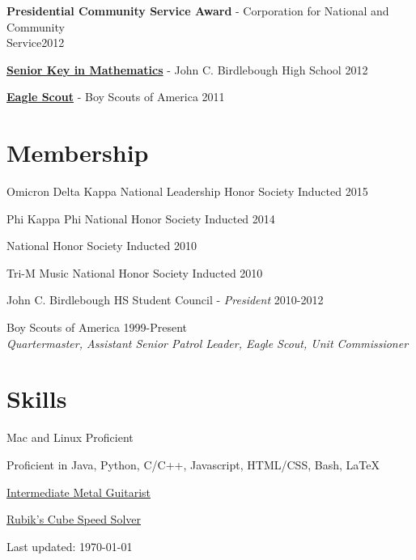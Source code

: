 \documentclass[8pt]{article}
\def\footerlink{}
\renewenvironment{itemize}{
  \begin{list}{}{
    \setlength{\leftmargin}{1.5em}
  }
}{
  \end{list}
}
\begin{document}
\begin{itemize}
\item \textbf{Presidential Community Service Award} - Corporation for National and Community \\Service\hfill 2012

\item \textbf{\href{http://www.oswegocountyweeklies.com/phoenix_register.php?details&story_id=5503&story_year=2012&story_month=6}{Senior Key in Mathematics}} - John C. Birdlebough High School \hfill 2012

\item \textbf{\href{http://www.oswegocountyweeklies.com/phoenix_register.php?details&story_id=6083&story_year=2012&story_month=8}{Eagle Scout}} - Boy Scouts of America \hfill 2011
\end{itemize}

\section*{Membership}
\begin{itemize}
\item Omicron Delta Kappa National Leadership Honor Society \hfill Inducted 2015
\item Phi Kappa Phi National Honor Society \hfill Inducted 2014
\item National Honor Society \hfill Inducted 2010
\item Tri-M Music National Honor Society \hfill Inducted 2010
\item John C. Birdlebough HS Student Council - \emph{President} \hfill 2010-2012
\item Boy Scouts of America \hfill 1999-Present\\
\emph{Quartermaster, Assistant Senior Patrol Leader, Eagle Scout, Unit Commissioner}
\end{itemize}

\section*{Skills}
\begin{itemize}
\item Mac and Linux Proficient
\item Proficient in Java, Python, C/C++, Javascript, HTML/CSS, Bash, {\LaTeX}
\item \href{https://youtu.be/1zDiQYErTgQ}{Intermediate Metal Guitarist}
\item \href{https://youtu.be/qPBg2xok04s}{Rubik's Cube Speed Solver}
\end{itemize}

\bigskip

\begin{center}
  \begin{footnotesize}
    Last updated: \today \\
    \href{\footerlink}{\texttt{\footerlink}}
  \end{footnotesize}
\end{center}
\end{document}
